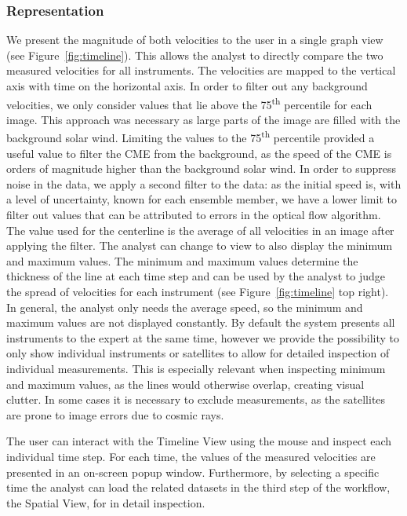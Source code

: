 \documentclass[journal]{vgtc}                %
\begin{document}
\subsubsection{Representation} \label{sec:representation}
We present the magnitude of both velocities to the user in a single graph view (see Figure~\ref{fig:timeline}). This allows the analyst to directly compare the two measured velocities for all instruments. The velocities are mapped to the vertical axis with time on the horizontal axis. In order to filter out any background velocities, we only consider values that lie above the 75\textsuperscript{th} percentile for each image. This approach was necessary as large parts of the image are filled with the background solar wind. Limiting the values to the 75\textsuperscript{th} percentile provided a useful value to filter the CME from the background, as the speed of the CME is orders of magnitude higher than the background solar wind. In order to suppress noise in the data, we apply a second filter to the data: as the initial speed is, with a level of uncertainty, known for each ensemble member, we have a lower limit to filter out values that can be attributed to errors in the optical flow algorithm. The value used for the centerline is the average of all velocities in an image after applying the filter. The analyst can change to view to also display the minimum and maximum values. The minimum and maximum values determine the thickness of the line at each time step and can be used by the analyst to judge the spread of velocities for each instrument (see Figure~\ref{fig:timeline} top right). In general, the analyst only needs the average speed, so the minimum and maximum values are not displayed constantly. By default the system presents all instruments to the expert at the same time, however we provide the possibility to only show individual instruments or satellites to allow for detailed inspection of individual measurements. This is especially relevant when inspecting minimum and maximum values, as the lines would otherwise overlap, creating visual clutter. In some cases it is necessary to exclude measurements, as the satellites are prone to image errors due to cosmic rays. 

The user can interact with the Timeline View using the mouse and inspect each individual time step. For each time, the values of the measured velocities are presented in an on-screen popup window. Furthermore, by selecting a specific time the analyst can load the related datasets in the third step of the workflow, the Spatial View, for in detail inspection.
\end{document}
